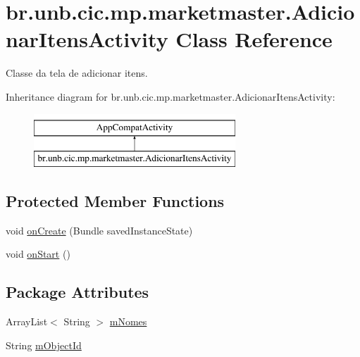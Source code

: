 \hypertarget{classbr_1_1unb_1_1cic_1_1mp_1_1marketmaster_1_1AdicionarItensActivity}{}\section{br.\+unb.\+cic.\+mp.\+marketmaster.\+Adicionar\+Itens\+Activity Class Reference}
\label{classbr_1_1unb_1_1cic_1_1mp_1_1marketmaster_1_1AdicionarItensActivity}


Classe da tela de adicionar itens.  


Inheritance diagram for br.\+unb.\+cic.\+mp.\+marketmaster.\+Adicionar\+Itens\+Activity\+:\begin{figure}[H]
\begin{center}
\leavevmode
\includegraphics[height=2.000000cm]{classbr_1_1unb_1_1cic_1_1mp_1_1marketmaster_1_1AdicionarItensActivity}
\end{center}
\end{figure}
\subsection*{Protected Member Functions}
\begin{DoxyCompactItemize}
\item 
void \mbox{\hyperlink{classbr_1_1unb_1_1cic_1_1mp_1_1marketmaster_1_1AdicionarItensActivity_ad1aeef0f1ffd01b6a39577fcb5d7e6e9}{on\+Create}} (Bundle saved\+Instance\+State)
\item 
void \mbox{\hyperlink{classbr_1_1unb_1_1cic_1_1mp_1_1marketmaster_1_1AdicionarItensActivity_abd2d821e45263308009f1d4368afc67b}{on\+Start}} ()
\end{DoxyCompactItemize}
\subsection*{Package Attributes}
\begin{DoxyCompactItemize}
\item 
Array\+List$<$ String $>$ \mbox{\hyperlink{classbr_1_1unb_1_1cic_1_1mp_1_1marketmaster_1_1AdicionarItensActivity_a2cc1950bd5c072f17fe2043c128f252c}{m\+Nomes}}
\item 
String \mbox{\hyperlink{classbr_1_1unb_1_1cic_1_1mp_1_1marketmaster_1_1AdicionarItensActivity_a77345b6ff2c31869dae56e38311bce28}{m\+Object\+Id}}
\end{DoxyCompactItemize}
